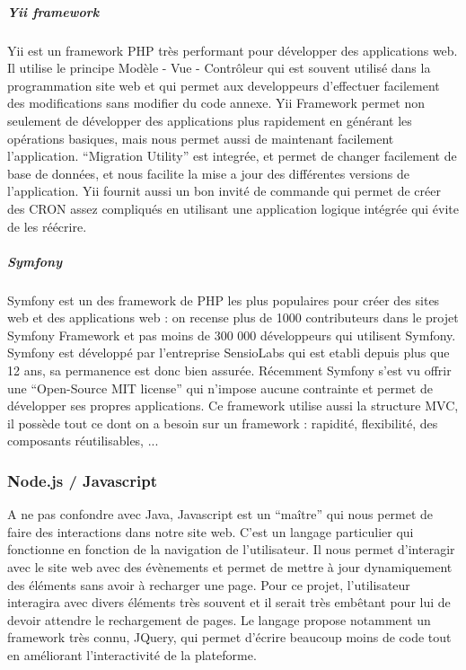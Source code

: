             \subparagraph{Yii framework}
            \label{subpar:yii}
            Yii est un framework PHP très performant pour développer des applications web. Il utilise
            le principe Modèle - Vue - Contrôleur qui est souvent utilisé dans la programmation site web
            et qui permet aux developpeurs d’effectuer facilement des modifications sans modifier du code annexe.
            Yii Framework permet non seulement de développer des applications plus rapidement en générant
            les opérations basiques, mais nous permet aussi de maintenant facilement l’application. “Migration Utility”
            est integrée, et permet de changer facilement de base de données, et nous facilite la mise a jour
            des différentes versions de l’application. Yii fournit aussi un bon invité de commande qui permet
            de créer des CRON assez compliqués en utilisant une application logique intégrée qui évite de les réécrire.

            \subparagraph{Symfony}
            \label{subpar:symfony}
            Symfony est un des framework de PHP les plus populaires pour créer des sites web et des applications web :
            on recense plus de 1000 contributeurs dans le projet Symfony Framework et pas moins de 300 000 développeurs
            qui utilisent Symfony. Symfony est développé par l'entreprise SensioLabs qui est etabli depuis plus que 12 ans,
            sa permanence est donc bien assurée. Récemment Symfony s’est vu offrir une “Open-Source MIT license”
            qui n'impose aucune contrainte et permet de développer ses propres applications. Ce framework utilise aussi
            la structure MVC, il possède tout ce dont on a besoin sur un framework : rapidité, flexibilité, des composants réutilisables, ...

        \subsubsection{Node.js / Javascript}
        \label{subsubsec:node}
        A ne pas confondre avec Java, Javascript est un “maître” qui nous permet de faire des
        interactions dans notre site web. C’est un langage particulier qui fonctionne en fonction de la
        navigation de l’utilisateur. Il nous permet d’interagir avec le site web avec des évènements et permet
        de mettre à jour dynamiquement des éléments sans avoir à recharger une page. Pour ce projet,
        l’utilisateur interagira avec divers éléments très souvent et il serait très embêtant pour lui de devoir
        attendre le rechargement de pages. Le langage propose notamment un framework très connu,
        JQuery, qui permet d’écrire beaucoup moins de code tout en améliorant l’interactivité de la
        plateforme.

